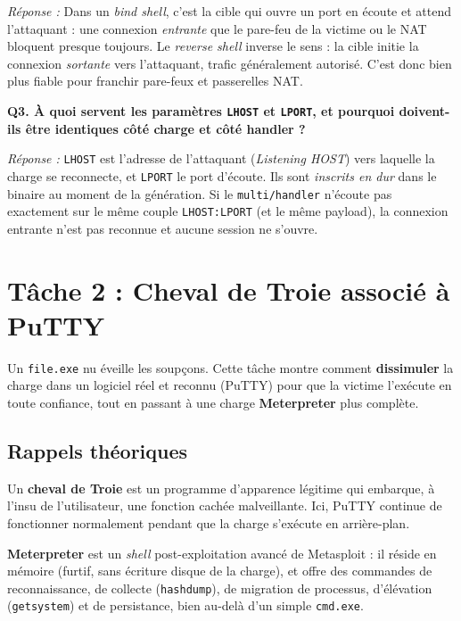 \documentclass[11pt,a4paper]{article}
\begin{document}
\textit{Réponse :} Dans un \emph{bind shell}, c'est la cible qui ouvre un port en écoute et
attend l'attaquant : une connexion \emph{entrante} que le pare-feu de la victime ou le NAT
bloquent presque toujours. Le \emph{reverse shell} inverse le sens : la cible initie la
connexion \emph{sortante} vers l'attaquant, trafic généralement autorisé. C'est donc bien plus
fiable pour franchir pare-feux et passerelles NAT.

\medskip\noindent\textbf{Q3. À quoi servent les paramètres \texttt{LHOST} et \texttt{LPORT}, et pourquoi doivent-ils être identiques côté charge et côté handler ?}

\textit{Réponse :} \texttt{LHOST} est l'adresse de l'attaquant (\emph{Listening HOST}) vers
laquelle la charge se reconnecte, et \texttt{LPORT} le port d'écoute. Ils sont \emph{inscrits
en dur} dans le binaire au moment de la génération. Si le \texttt{multi/handler} n'écoute pas
exactement sur le même couple \texttt{LHOST:LPORT} (et le même payload), la connexion entrante
n'est pas reconnue et aucune session ne s'ouvre.

\section{Tâche 2 : Cheval de Troie associé à PuTTY}
Un \texttt{file.exe} nu éveille les soupçons. Cette tâche montre comment \textbf{dissimuler}
la charge dans un logiciel réel et reconnu (PuTTY) pour que la victime l'exécute en toute
confiance, tout en passant à une charge \textbf{Meterpreter} plus complète.

\subsection{Rappels théoriques}
Un \textbf{cheval de Troie} est un programme d'apparence légitime qui embarque, à l'insu de
l'utilisateur, une fonction cachée malveillante. Ici, PuTTY continue de fonctionner
normalement pendant que la charge s'exécute en arrière-plan.

\textbf{Meterpreter} est un \emph{shell} post-exploitation avancé de Metasploit : il réside en
mémoire (furtif, sans écriture disque de la charge), et offre des commandes de reconnaissance,
de collecte (\texttt{hashdump}), de migration de processus, d'élévation (\texttt{getsystem})
et de persistance, bien au-delà d'un simple \texttt{cmd.exe}.
\end{document}
